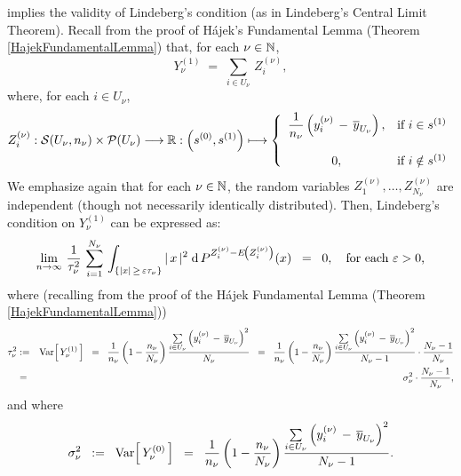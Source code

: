 implies the validity of Lindeberg's condition (as in Lindeberg's Central Limit Theorem).
Recall from the proof of H\'ajek's Fundamental Lemma (Theorem \ref{HajekFundamentalLemma})
that, for each $\nu\in\N$,
\begin{equation*}
Y^{(1)}_{\nu} \; = \; \sum_{i\in U_{\nu}}\,Z^{(\nu)}_{i},
\end{equation*}
where, for each $i \in U_{\nu}$,
\begin{equation*}
Z^{(\nu)}_{i} : \mathcal{S}(U_{\nu},n_{\nu}) \times \mathcal{P}(U_{\nu}) \longrightarrow \Re :
\left(s^{(0)},s^{(1)}\right) \longmapsto
\left\{\begin{array}{cl}
\dfrac{1}{n_{\nu}}\left(y^{(\nu)}_{i}\,-\,\overline{y}_{U_{\nu}}\right), & \textnormal{if $i \in s^{(1)}$}
\\ \\
0, & \textnormal{if $i \notin s^{(1)}$}
\end{array}\right.
\end{equation*}
We emphasize again that for each $\nu\in\N$, the random variables
$Z^{(\nu)}_{1}, \ldots, Z^{(\nu)}_{N_{\nu}}$ are independent
(though not necessarily identically distributed).
Then, Lindeberg's condition on $Y^{(1)}_{\nu}$ can be expressed as:
\begin{equation*}
\lim_{n\rightarrow\infty}\,
\dfrac{1}{\tau^{2}_{\nu}}\,
\sum_{i=1}^{N_{\nu}}\,
\int_{\left\{\vert x\vert \,\geq\, \varepsilon\tau_{\nu}\right\}}
\vert\,x\,\vert^{2}\;
\d\,P^{Z^{(\nu)}_{i} - E\!\left(Z^{(\nu)}_{i}\right)}(x)
\;\;=\;\;0,
\quad\textnormal{for each $\varepsilon > 0$,}
\end{equation*}
where (recalling from the proof of the H\'ajek Fundamental Lemma (Theorem \ref{HajekFundamentalLemma}))
\begin{eqnarray*}
\tau^{2}_{\nu}
& := &
\Var\!\left[\,Y^{(1)}_{\nu}\,\right]
\;\; = \;\;
\dfrac{1}{n_{\nu}}
\left(1 - \dfrac{n_{\nu}}{N_{\nu}}\right)
\dfrac{\underset{i\in U_{\nu}}{\sum}\left(y^{(\nu)}_{i}\,-\,\overline{y}_{U_{\nu}}\right)^{2}}{N_{\nu}}
\;\; = \;\;
\dfrac{1}{n_{\nu}}
\left(1 - \dfrac{n_{\nu}}{N_{\nu}}\right)
\dfrac{\underset{i\in U_{\nu}}{\sum}\left(y^{(\nu)}_{i}\,-\,\overline{y}_{U_{\nu}}\right)^{2}}{N_{\nu}-1}
\cdot
\dfrac{N_{\nu}-1}{N_{\nu}}
\\
& = &
\sigma^{2}_{\nu}
\cdot
\dfrac{N_{\nu}-1}{N_{\nu}},
\end{eqnarray*}
and where
\begin{equation*}
\sigma^{2}_{\nu}
\;\; := \;\;
\Var\!\left[\,Y^{(0)}_{\nu}\,\right]
\;\; = \;\;
\dfrac{1}{n_{\nu}}
\left(1 - \dfrac{n_{\nu}}{N_{\nu}}\right)
\dfrac{\underset{i\in U_{\nu}}{\sum}\left(y^{(\nu)}_{i}\,-\,\overline{y}_{U_{\nu}}\right)^{2}}{N_{\nu}-1}.
\end{equation*}
